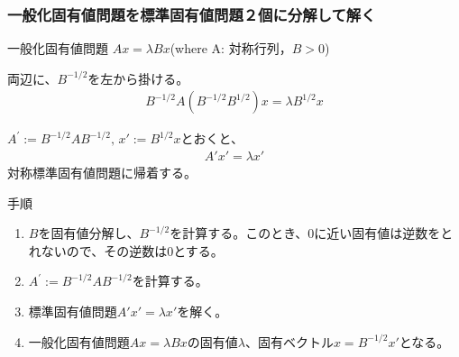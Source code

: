 
\begin{frame}[c,fragile]
  \frametitle{一般化固有値問題を標準固有値問題２個に分解して解く}
一般化固有値問題
$A x = \lambda B x$\quad(where A: 対称行列，$B>0$)

両辺に、$B^{-1/2}$を左から掛ける。
\begin{align}
B^{-1/2} A (B^{-1/2} B^{1/2}) x = \lambda B^{1/2} x
\end{align}

$A^\prime := B^{-1/2} A B^{-1/2},\,  x' := B^{1/2} x$とおくと、
\begin{align}
A' x' = \lambda x'
\end{align}
対称標準固有値問題に帰着する。

手順\\
\begin{enumerate}
\item $B$を固有値分解し、$B^{-1/2}$を計算する。このとき、$0$に近い固有値は逆数をとれないので、その逆数は$0$とする。
\item $A^\prime := B^{-1/2} A B^{-1/2}$を計算する。
\item 標準固有値問題$A' x' = \lambda x'$を解く。
\item 一般化固有値問題$A x = \lambda B x$の固有値$\lambda$、固有ベクトル$x=B^{-1/2}x'$となる。
\end{enumerate}
\end{frame}

